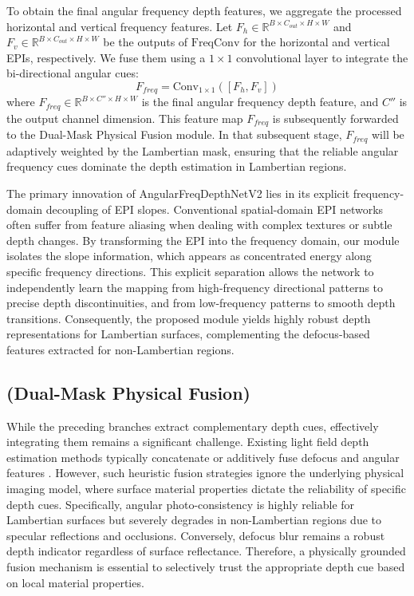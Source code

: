 To obtain the final angular frequency depth features, we aggregate the processed horizontal and vertical frequency features. Let $F_{h} \in \mathbb{R}^{B \times C_{out} \times H \times W}$ and $F_{v} \in \mathbb{R}^{B \times C_{out} \times H \times W}$ be the outputs of $\text{FreqConv}$ for the horizontal and vertical EPIs, respectively. We fuse them using a $1 \times 1$ convolutional layer to integrate the bi-directional angular cues:
\begin{equation}
\label{eq:eq22}
F_{freq} = \text{Conv}_{1 \times 1}([F_{h}, F_{v}])
\end{equation}
where $F_{freq} \in \mathbb{R}^{B \times C'' \times H \times W}$ is the final angular frequency depth feature, and $C''$ is the output channel dimension. This feature map $F_{freq}$ is subsequently forwarded to the Dual-Mask Physical Fusion module. In that subsequent stage, $F_{freq}$ will be adaptively weighted by the Lambertian mask, ensuring that the reliable angular frequency cues dominate the depth estimation in Lambertian regions.

The primary innovation of AngularFreqDepthNetV2 lies in its explicit frequency-domain decoupling of EPI slopes. Conventional spatial-domain EPI networks often suffer from feature aliasing when dealing with complex textures or subtle depth changes. By transforming the EPI into the frequency domain, our module isolates the slope information, which appears as concentrated energy along specific frequency directions. This explicit separation allows the network to independently learn the mapping from high-frequency directional patterns to precise depth discontinuities, and from low-frequency patterns to smooth depth transitions. Consequently, the proposed module yields highly robust depth representations for Lambertian surfaces, complementing the defocus-based features extracted for non-Lambertian regions.

\subsection{(Dual-Mask Physical Fusion)}

While the preceding branches extract complementary depth cues, effectively integrating them remains a significant challenge. Existing light field depth estimation methods typically concatenate or additively fuse defocus and angular features . However, such heuristic fusion strategies ignore the underlying physical imaging model, where surface material properties dictate the reliability of specific depth cues. Specifically, angular photo-consistency is highly reliable for Lambertian surfaces but severely degrades in non-Lambertian regions due to specular reflections and occlusions. Conversely, defocus blur remains a robust depth indicator regardless of surface reflectance. Therefore, a physically grounded fusion mechanism is essential to selectively trust the appropriate depth cue based on local material properties.

